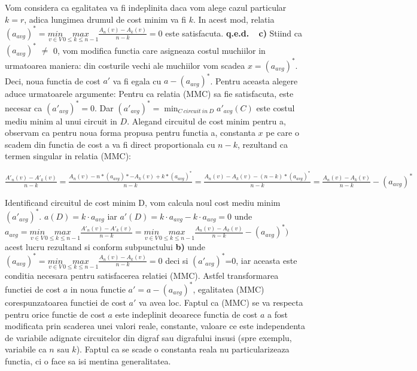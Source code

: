 \documentclass{article}
\begin{document}
\newline
Vom considera ca egalitatea va fi indeplinita daca vom alege cazul particular $k=r$, adica lungimea drumul de cost minim va fi $k$. In acest mod, relatia {$(a_{avg})^* = \underset{v \in V}{min} \underset{0 \leq k \le n-1}{max}\frac{A_n(v) - A_k(v)}{n-k} = 0$} este satisfacuta. \textbf{q.e.d.}
\newline
\
\newline
\textbf{c)} Stiind ca $(a_{avg})^*$ $\neq$ 0, vom modifica functia care asigneaza costul muchiilor in urmatoarea maniera: din costurile vechi ale muchiilor vom scadea $x=(a_{avg})^*$. Deci, noua functia de cost $a'$ va fi egala cu $a-(a_{avg})^*$. Pentru aceasta alegere aduce urmatoarele argumente: 
\newline
\newline
Pentru ca relatia (MMC) sa fie satisfacuta, este necesar ca $(a'_{avg})^*=0$.
\newline 
Dar $(a'_{avg})^*=\min\nolimits_{C\ circuit\ in\ D} a'_{avg}(C)$ este costul mediu minim al unui circuit in $D$. Alegand circuitul de cost minim pentru a, observam ca pentru noua forma propusa pentru functia a, constanta $x$ pe care o scadem din functia de cost a va fi direct proportionala cu $n-k$, rezultand ca termen singular in relatia (MMC):
\begin{center}
{$\frac{A'_n(v) - A'_k(v)}{n-k} = \frac{A_n(v) - n*(a_{avg})* - A_k(v) + k*(a_{avg})^*}{n-k} = \frac{A_n(v) - A_k(v) - (n-k)*(a_{avg})^*}{n-k} = \frac{A_n(v)-A_k(v)}{n-k} - (a_{avg})^*$}
\end{center} 
Identificand circuitul de cost minim D, vom calcula noul cost mediu minim $(a'_{avg})^*$. $a(D)=k\cdot a_{avg}$ iar $a'(D)=k \cdot a_{avg} - k \cdot a_{avg}=0$ unde $a_{avg}= \underset{v \in V}{min} \underset{0 \leq k \le n-1}{max}\frac{A'_n(v) - A'_k(v)}{n-k} = \underset{v \in V}{min} \underset{0 \leq k \le n-1}{max}\frac{A_n(v) - A_k(v)}{n-k}-(a_{avg})^*)$ acest lucru rezultand si conform subpunctului \textbf{b)} unde $(a_{avg})^* = \underset{v \in V}{min} \underset{0 \leq k \le n-1}{max}\frac{A_n(v) - A_k(v)}{n-k} =0$ deci si $(a'_{avg})^*$=0, iar aceasta este conditia necesara pentru satisfacerea relatiei (MMC). Astfel transformarea functiei de cost $a$ in noua functie $a'=a-(a_{avg})^*$, egalitatea (MMC) corespunzatoarea functiei de cost $a'$ va avea loc.
\newline
\newline
Faptul ca (MMC) se va respecta pentru orice functie de cost $a$ este indeplinit deoarece functia de cost $a$ a fost modificata prin scaderea unei valori reale, constante, valoare ce este independenta de variabile adignate circuitelor din digraf sau digrafului insusi (spre exemplu, variabile ca $n$ sau $k$). Faptul ca se scade o constanta reala nu particularizeaza functia, ci o face sa isi mentina generalitatea. 
\
\end{document}
